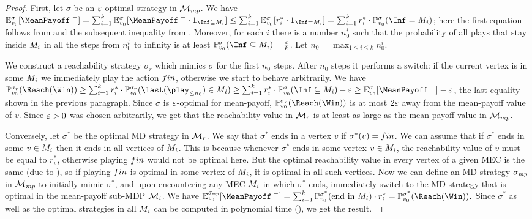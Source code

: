 \begin{proof}
First, let $\sigma$ be an $\varepsilon$-optimal strategy in $\mathcal{M}_{\mathit{mp}}$. 
We have $\expv^\sigma_{\vinit}[\MeanPayoffInf] = \sum_{i=1}^k\expv^\sigma_{\vinit}[\MeanPayoffInf\cdot \indicator{\Inf\subseteq\mec_i}] \leq \sum_{i=1}^k \expv^\sigma_{\vinit}[r_i^*\cdot \indicator{\Inf=\mec_i}] = \sum_{i=1}^k r_i^* \cdot \probm_{\vinit}^\sigma(\Inf=\mec_i) $; here the first equation follows from  and the subsequent inequality from . Moreover, for each $i$ there is a number $n_0^i$ such that the probability of all plays that stay inside $M_i$ in all the steps from $n_0^i$ to infinity is at least $\probm_{\vinit}^\sigma(\Inf\subseteq\mec_i) - \frac{\eps}{k} $. Let $n_0 = \max_{1\leq i \leq k} n^i_0$.

We construct a reachability strategy $\sigma_r$ which mimics $\sigma$ for the first $n_0$ steps. After $n_0$ steps it performs a switch: if the current vertex is in some $M_i$ we immediately play the action $fin$, otherwise we start to behave arbitrarily. We have $\probm_{\vinit}^{\sigma_r}(\Reach(\Win)) \geq \sum_{i=1}^{k} r_i^* \cdot \probm_{\vinit}^{\sigma_r}(\last(\play_{\leq n_0}) \in \mec_i ) \geq \sum_{i=1}^k r_i^* \cdot \probm_{\vinit}^\sigma(\Inf\subseteq\mec_i) - \eps \geq \expv^\sigma_{\vinit}[\MeanPayoffInf] -\eps$, the last equality shown in the previous paragraph. Since $\sigma$ is $\varepsilon$-optimal for mean-payoff, $\probm_{\vinit}^{\sigma_r}(\Reach(\Win))$ is at most $2\varepsilon$ away from the mean-payoff value of $ v $. Since $\varepsilon>0$ was chosen arbitrarily, we get that the reachability value in $\mathcal{M}_{r}$ is at least as large as the mean-payoff value in $\mathcal{M}_{\mathit{mp}}$.

Conversely, let $\sigma^*$ be the optimal MD strategy in $\mathcal{M}_r$. We say that $\sigma^*$ ends in a vertex $v$ if $\sigma^*(v)=fin$. We can assume that if $\sigma^*$ ends in some $v \in M_i$ then it ends in all vertices of $M_i$. This is because whenever $\sigma^*$ ends in some vertex $v \in M_i$, the reachability value of $v$ must be equal to $r^*_i$, otherwise playing $fin$ would not be optimal here. But the optimal reachability value in every vertex of a given MEC is the same (due to ), so if playing $fin$ is optimal in some vertex of $M_i$, it is optimal in all such vertices. Now we can define an MD strategy $\sigma_{\mathit{mp}}$ in $\mathcal{M}_{\mathit{mp}}$ to initially mimic $\sigma^*$, and upon encountering any MEC $M_i$ in which $\sigma^*$ ends, immediately switch to the MD strategy that is optimal in the mean-payoff sub-MDP $\mathcal{M}_i$. We have $\expv^{\sigma_{\smallmp}}_{\vinit}[\MeanPayoffInf]  =  \sum_{i=1}^{k} \probm^{\sigma^*}_{\vinit}(\text{end in }\mec_i)\cdot r^*_i = \probm^{\sigma^*}_{\vinit} (\Reach(\Win)). $ Since $\sigma^*$ as well as the optimal strategies in all $M_i$ can be computed in polynomial time (), we get the result.
%
\end{proof}

